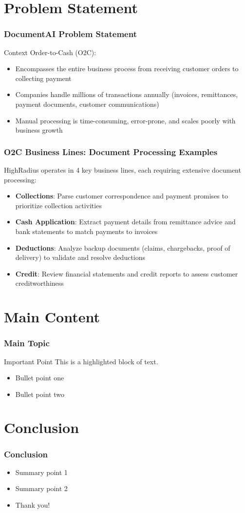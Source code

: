 \documentclass{beamer}
\begin{document}
\section{Problem Statement}

\begin{frame}
\frametitle{DocumentAI Problem Statement}
\begin{block}{Context}
Order-to-Cash (O2C):
\begin{itemize}
    \item Encompasses the entire business process from receiving customer orders to collecting payment
    \item Companies handle millions of transactions annually (invoices, remittances, payment documents, customer communications)
    \item Manual processing is time-consuming, error-prone, and scales poorly with business growth
\end{itemize}
\end{block}
\end{frame}

\begin{frame}
\frametitle{O2C Business Lines: Document Processing Examples}
HighRadius operates in 4 key business lines, each requiring extensive document processing:

\begin{itemize}
    \item \textbf{Collections}: Parse customer correspondence and payment promises to prioritize collection activities
    \item \textbf{Cash Application}: Extract payment details from remittance advice and bank statements to match payments to invoices
    \item \textbf{Deductions}: Analyze backup documents (claims, chargebacks, proof of delivery) to validate and resolve deductions
    \item \textbf{Credit}: Review financial statements and credit reports to assess customer creditworthiness
\end{itemize}
\end{frame}

\section{Main Content}
\begin{frame}
\frametitle{Main Topic}
\begin{block}{Important Point}
This is a highlighted block of text.
\end{block}

\begin{itemize}
    \item Bullet point one
    \item Bullet point two
\end{itemize}
\end{frame}

\section{Conclusion}
\begin{frame}
\frametitle{Conclusion}
\begin{itemize}
    \item Summary point 1
    \item Summary point 2
    \item Thank you!
\end{itemize}
\end{frame}
\end{document}
